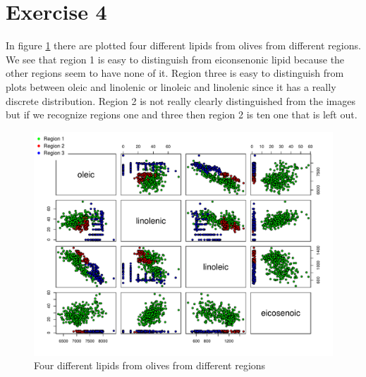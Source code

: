 \documentclass[a4paper,10pt]{article}
\begin{document}
\newpage
\section{Exercise 4}

In figure \ref{Lipds} there are plotted four different lipids from olives from different regions. We see that region 1 is easy to distinguish from eiconsenonic lipid because the other regions seem to have none of it. Region three is easy to distinguish from plots between oleic and linolenic or linoleic and linolenic since it has a really discrete distribution. Region 2 is not really clearly distinguished from the images but if we recognize regions one and three then region 2 is ten one that is left out. 
\begin{figure}[h!]
\centering
\includegraphics[width = \linewidth]{trellis}
\caption{Four different lipids from olives from different regions}
\label{Lipds}
\end{figure}
\end{document}
